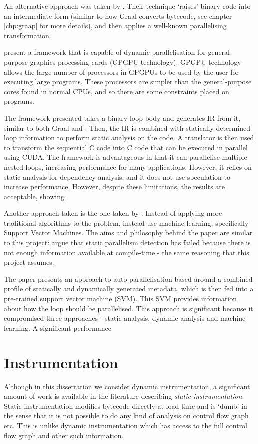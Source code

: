 An alternative approach was taken by \citet{Ketterlin}. Their technique `raises' binary code into an intermediate form (similar to how Graal converts bytecode, see chapter \ref{chp:graap} for more details), and then applies a well-known parallelising transformation.

\citet{Dong} present a framework that is capable of dynamic parallelisation for general-purpose graphics processing cards (GPGPU technology). GPGPU technology allows the large number of processors in GPGPUs to be used by the user for executing large programs. These processors are simpler than the general-purpose cores found in normal CPUs, and so there are some constraints placed on programs.

The framework presented takes a binary loop body and generates IR from it, similar to both Graal and \citet{Ketterlin}. Then, the IR is combined with statically-determined loop information to perform static analysis on the code. A translator is then used to transform the sequential C code into C code that can be executed in parallel using CUDA. The framework is advantageous in that it can parallelise multiple nested loops, increasing performance for many applications. However, it relies on static analysis for dependency analysis, and it does not use speculation to increase performance. However, despite these limitations, the results are acceptable, showing 

Another approach taken is the one taken by \citet{Tournavitis2009}. Instead of applying more traditional algorithms to the problem, \citeauthor{Tournavitis2009} instead use machine learning, specifically Support Vector Machines. The aims and philosophy behind the paper are similar to this project: \citeauthor{Tournavitis2009} argue that static parallelism detection has failed because there is not enough information available at compile-time - the same reasoning that this project assumes.

The paper presents an approach to auto-parallelisation based around a combined profile of statically and dynamically generated metadata, which is then fed into a pre-trained support vector machine (SVM). This SVM provides information about how the loop should be parallelised. This approach is significant because it compromised three approaches - static analysis, dynamic analysis and machine learning. A significant performance 

\section{Instrumentation} \label{sec:related/instrumentation}
Although in this dissertation we consider dynamic instrumentation, a significant amount of work is available in the literature describing \emph{static instrumentation}. Static instrumentation modifies bytecode directly at load-time and is `dumb' in the sense that it is not possible to do any kind of analysis on control flow graph etc. This is unlike dynamic instrumentation which has access to the full control flow graph and other such information.

